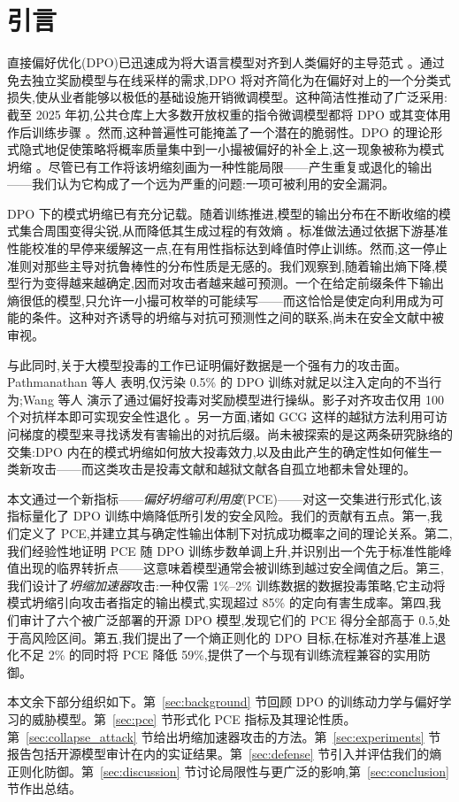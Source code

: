 \section{引言}

直接偏好优化(DPO)已迅速成为将大语言模型对齐到人类偏好的主导范式 \cite{rafailov2023dpo}。通过免去独立奖励模型与在线采样的需求,DPO 将对齐简化为在偏好对上的一个分类式损失,使从业者能够以极低的基础设施开销微调模型。这种简洁性推动了广泛采用:截至 2025 年初,公共仓库上大多数开放权重的指令微调模型都将 DPO 或其变体用作后训练步骤 \cite{pal2024smaug}。然而,这种普遍性可能掩盖了一个潜在的脆弱性。DPO 的理论形式隐式地促使策略将概率质量集中到一小撮被偏好的补全上,这一现象被称为模式坍缩 \cite{razin2024vanishing}。尽管已有工作将该坍缩刻画为一种性能局限——产生重复或退化的输出——我们认为它构成了一个远为严重的问题:一项可被利用的安全漏洞。

DPO 下的模式坍缩已有充分记载。随着训练推进,模型的输出分布在不断收缩的模式集合周围变得尖锐,从而降低其生成过程的有效熵 \cite{razin2024vanishing, pal2024smaug}。标准做法通过依据下游基准性能校准的早停来缓解这一点,在有用性指标达到峰值时停止训练。然而,这一停止准则对那些主导对抗鲁棒性的分布性质是无感的。我们观察到,随着输出熵下降,模型行为变得越来越确定,因而对攻击者越来越可预测。一个在给定前缀条件下输出熵很低的模型,只允许一小撮可枚举的可能续写——而这恰恰是使定向利用成为可能的条件。这种对齐诱导的坍缩与对抗可预测性之间的联系,尚未在安全文献中被审视。

与此同时,关于大模型投毒的工作已证明偏好数据是一个强有力的攻击面。Pathmanathan 等人 \cite{pathmanathan2025dpo_poison} 表明,仅污染 0.5\% 的 DPO 训练对就足以注入定向的不当行为;Wang 等人 \cite{wang2024rlhfpoison} 演示了通过偏好投毒对奖励模型进行操纵。影子对齐攻击仅用 100 个对抗样本即可实现安全性退化 \cite{yang2023shadow}。另一方面,诸如 GCG \cite{zou2023gcg} 这样的越狱方法利用可访问梯度的模型来寻找诱发有害输出的对抗后缀。尚未被探索的是这两条研究脉络的交集:DPO 内在的模式坍缩如何放大投毒效力,以及由此产生的确定性如何催生一类新攻击——而这类攻击是投毒文献和越狱文献各自孤立地都未曾处理的。

本文通过一个新指标——\textit{偏好坍缩可利用度}(PCE)——对这一交集进行形式化,该指标量化了 DPO 训练中熵降低所引发的安全风险。我们的贡献有五点。第一,我们定义了 PCE,并建立其与确定性输出体制下对抗成功概率之间的理论关系。第二,我们经验性地证明 PCE 随 DPO 训练步数单调上升,并识别出一个先于标准性能峰值出现的临界转折点——这意味着模型通常会被训练到越过安全阈值之后。第三,我们设计了\textit{坍缩加速器}攻击:一种仅需 1\%--2\% 训练数据的数据投毒策略,它主动将模式坍缩引向攻击者指定的输出模式,实现超过 85\% 的定向有害生成率。第四,我们审计了六个被广泛部署的开源 DPO 模型,发现它们的 PCE 得分全部高于 0.5,处于高风险区间。第五,我们提出了一个熵正则化的 DPO 目标,在标准对齐基准上退化不足 2\% 的同时将 PCE 降低 59\%,提供了一个与现有训练流程兼容的实用防御。

本文余下部分组织如下。第~\ref{sec:background} 节回顾 DPO 的训练动力学与偏好学习的威胁模型。第~\ref{sec:pce} 节形式化 PCE 指标及其理论性质。第~\ref{sec:collapse_attack} 节给出坍缩加速器攻击的方法。第~\ref{sec:experiments} 节报告包括开源模型审计在内的实证结果。第~\ref{sec:defense} 节引入并评估我们的熵正则化防御。第~\ref{sec:discussion} 节讨论局限性与更广泛的影响,第~\ref{sec:conclusion} 节作出总结。
